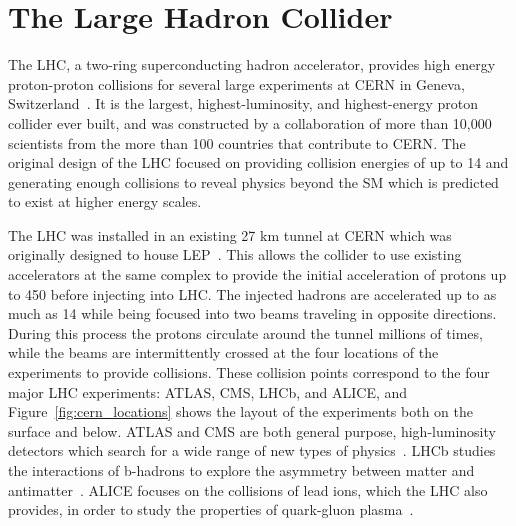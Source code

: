 \chapter{The Large Hadron Collider}

\label{ch:lhc}

The \ac{LHC}, a two-ring superconducting hadron accelerator, provides high energy proton-proton collisions for several large experiments at \ac{CERN} in Geneva, Switzerland~\cite{lhc_machine, lhc_guide}. 
It is the largest, highest-luminosity, and highest-energy proton collider ever built, and was constructed by a collaboration of more than 10,000 scientists from the more than 100 countries that contribute to \ac{CERN}.
The original design of the \ac{LHC} focused on providing collision energies of up to 14 \TeV and generating enough collisions to reveal physics beyond the \ac{SM} which is predicted to exist at higher energy scales.

The \ac{LHC} was installed in an existing 27 km tunnel at \ac{CERN} which was originally designed to house \ac{LEP}~\cite{lep_tdr}.
This allows the collider to use existing accelerators at the same complex to provide the initial acceleration of protons up to 450 \GeV before injecting into \ac{LHC}.
The injected hadrons are accelerated up to as much as 14 \TeV while being focused into two beams traveling in opposite directions.
During this process the protons circulate around the tunnel millions of times, while the beams are intermittently crossed at the four locations of the experiments to provide collisions.
These collision points correspond to the four major \ac{LHC} experiments: ATLAS, \ac{CMS}, \ac{LHCb}, and \ac{ALICE}, and Figure~\ref{fig:cern_locations} shows the layout of the experiments both on the surface and below.
ATLAS and \ac{CMS} are both general purpose, high-luminosity detectors which search for a wide range of new types of physics~\cite{atlas_experiment, cms_experiment}.
\ac{LHCb} studies the interactions of b-hadrons to explore the asymmetry between matter and antimatter~\cite{lhcb_experiment}.
\ac{ALICE} focuses on the collisions of lead ions, which the \ac{LHC} also provides, in order to study the properties of quark-gluon plasma~\cite{alice_experiment}.

